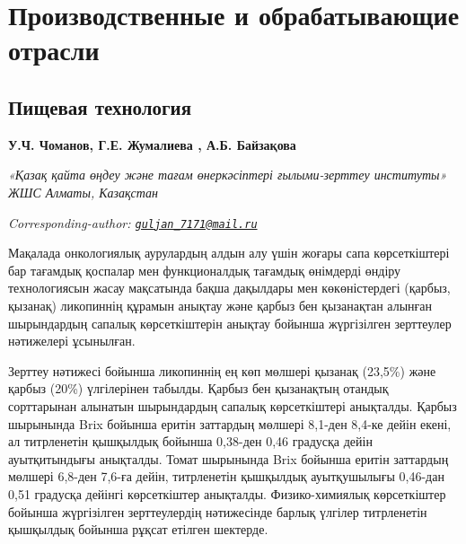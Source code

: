 \newpage
\let\cleardoublepage\clearpage
\part{Производственные и обрабатывающие отрасли}
\chapter{Пищевая технология}

\begin{articleheader}

{\bfseries У.Ч. Чоманов,
Г.Е. Жумалиева\textsuperscript{\envelope } ,
А.Б. Байзақова}
\end{articleheader}

\begin{affiliation}
\emph{«Қазақ қайта өңдеу және тағам өнеркәсіптері ғылыми-зерттеу институты» ЖШС Алматы, Казақстан}

\raggedright \textsuperscript{\envelope }{\em Corresponding-author: \href{mailto:guljan_7171@mail.ru}{\nolinkurl{guljan\_7171@mail.ru}}}
\end{affiliation}

Мақалада онкологиялық аурулардың алдын алу үшін жоғары сапа
көрсеткіштері бар тағамдық қоспалар мен функционалдық тағамдық өнімдерді
өндіру технологиясын жасау мақсатында бақша дақылдары мен көкөністердегі
(қарбыз, қызанақ) ликопиннің құрамын анықтау және қарбыз бен қызанақтан
алынған шырындардың сапалық көрсеткіштерін анықтау бойынша жүргізілген
зерттеулер нәтижелері ұсынылған.

Зерттеу нәтижесі бойынша ликопиннің ең көп мөлшері қызанақ (23,5\%) және
қарбыз (20\%) үлгілерінен табылды. Қарбыз бен қызанақтың отандық
сорттарынан алынатын шырындардың сапалық көрсеткіштері анықталды. Қарбыз
шырынында Brix бойынша еритін заттардың мөлшері 8,1-ден 8,4-ке дейін
екені, ал титрленетін қышқылдық бойынша 0,38-ден 0,46 градусқа дейін
ауытқитындығы анықталды. Томат шырынында Brix бойынша еритін заттардың
мөлшері 6,8-ден 7,6-ға дейін, титрленетін қышқылдық ауытқушылығы
0,46-дан 0,51 градусқа дейінгі көрсеткіштер анықталды. Физико-химиялық
көрсеткіштер бойынша жүргізілген зерттеулердің нәтижесінде барлық
үлгілер титрленетін қышқылдық бойынша рұқсат етілген шектерде.

